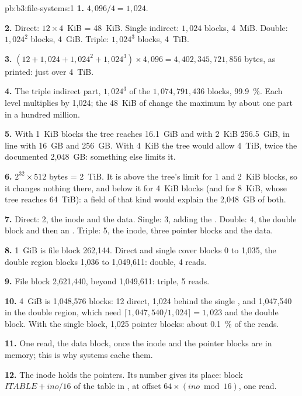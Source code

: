 \begin{solution}{pb:b3:file-systems:1}
\textbf{1.} $4{,}096/4 = 1{,}024$.

\textbf{2.} Direct: $12 \times 4$~KiB = 48~KiB. Single indirect: $1{,}024$ blocks, 4~MiB. Double: $1{,}024^2$ blocks, 4~GiB. Triple: $1{,}024^3$ blocks, 4~TiB.

\textbf{3.} $(12 + 1{,}024 + 1{,}024^2 + 1{,}024^3) \times 4{,}096 = 4{,}402{,}345{,}721{,}856$ bytes, as printed: just over 4~TiB.

\textbf{4.} The triple indirect part, $1{,}024^3$ of the $1{,}074{,}791{,}436$ blocks, 99.9~\%. Each level multiplies by 1,024; the 48~KiB of  change the maximum by about one part in a hundred million.

\textbf{5.} With 1~KiB blocks the tree reaches 16.1~GiB and with 2~KiB 256.5~GiB, in line with 16~GB and 256~GB. With 4~KiB the tree would allow 4~TiB, twice the documented 2,048~GB: something else limits it.

\textbf{6.} $2^{32} \times 512$ bytes = 2~TiB. It is above the tree's limit for 1 and 2~KiB blocks, so it changes nothing there, and below it for 4~KiB blocks (and for 8~KiB, whose tree reaches 64~TiB): a field of that kind would explain the 2,048~GB of both.

\textbf{7.} Direct: 2, the inode and the data. Single: 3, adding the . Double: 4, the double block and then an . Triple: 5, the inode, three pointer blocks and the data.

\textbf{8.} 1~GiB is file block 262,144. Direct and single cover blocks 0 to 1,035, the double region blocks 1,036 to 1,049,611: double, 4 reads.

\textbf{9.} File block 2,621,440, beyond 1,049,611: triple, 5 reads.

\textbf{10.} 4~GiB is 1,048,576 blocks: 12 direct, 1,024 behind the single , and 1,047,540 in the double region, which need $\lceil 1{,}047{,}540/1{,}024 \rceil = 1{,}023$  and the double block. With the single block, 1,025 pointer blocks: about 0.1~\% of the reads.

\textbf{11.} One read, the data block, once the inode and the pointer blocks are in memory; this is why systems cache them.

\textbf{12.} The inode holds the pointers. Its number gives its place: block $\mathit{ITABLE} + \mathit{ino}/16$ of the table in , at offset $64 \times (\mathit{ino} \bmod 16)$, one read.


\end{solution}

